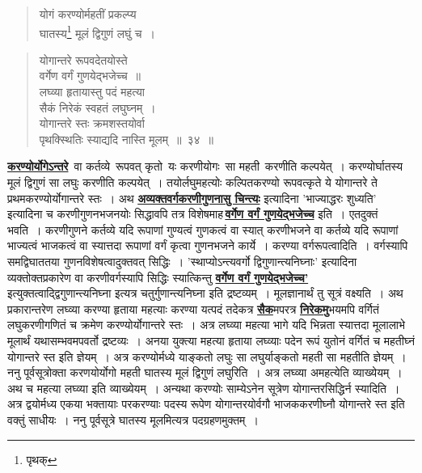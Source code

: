 \documentclass[11pt, openany]{book}
\begin{document}
 \label{34}
{\begin{quote}
\ab
योगं करण्योर्महतीं प्रकल्प्य \\
घातस्य\footnote{पृथक्} मूलं द्विगुणं लघुं च~।
\end{quote}
\thispagestyle{empty}
\afterpage{\fancyhead[LE,RO]{\thepage}}
\cfoot{}
\newpage 

{\begin{quote}
 {\ab योगान्तरे रूपवदेतयोस्ते \\
 वर्गेण वर्गं गुणयेद्भजेच्च~॥\\
लघ्व्या हृतायास्तु पदं महत्या \\
सैकं निरेकं स्वहतं लघुघ्नम्~। \\
योगान्तरे स्तः क्रमशस्तयोर्वा \\
पृथक्स्थितिः स्याद्यदि नास्ति मूलम्~॥~३४~॥}  
\end{quote}

\hyperref[34]{\textbf{करण्योर्योगेऽन्तरे}} \,वा कर्तव्ये \,रूपवत् कृतो \,यः करणीयोगः \,सा महती \,करणीति 
कल्पयेत्~। करण्योर्घातस्य मूलं द्विगुणं सा लघुः करणीति कल्पयेत्~।
तयोर्लघुमहत्योः कल्पितकरण्यो रूपवत्कृते ये योगान्तरे ते
प्रथमकरण्योर्योगान्तरे स्तः~। अथ \hyperref[27]{\textbf{अव्यक्तवर्गकरणीगुणनासु चिन्त्यः}} इत्यादिना {\qt 'भाज्याद्धरः शुध्यति'} इत्यादिना च करणीगुणनभजनयोः सिद्धावपि तत्र विशेषमाह\textendash \,\hyperref[34]{\textbf{वर्गेण वर्गं गुणयेद्भजेच्च}} इति~। एतदुक्तं भवति~। करणीगुणने कर्तव्ये यदि रूपाणां गुण्यत्वं गुणकत्वं वा 
स्यात् करणीभजने वा कर्तव्ये यदि रूपाणां भाज्यत्वं भाजकत्वं वा स्यात्तदा
रूपाणां वर्गं कृत्वा गुणनभजने कार्ये~। करण्या वर्गरूपत्वादिति~।
वर्गस्यापि समद्विघाततया गुणनविशेषत्वादुक्तवत् सिद्धिः~। {\qt 'स्थाप्योऽन्त्यवर्गो
द्विगुणान्त्यनिघ्नाः'} इत्यादिना व्यक्तोक्तप्रकारेण वा करणीवर्गस्यापि सिद्धिः स्यात्किन्तु
\hyperref[34]{\textbf{वर्गेण वर्गं गुणयेद्भजेच्च'}} इत्युक्तत्वाद्द्विगुणान्त्यनिघ्ना
इत्यत्र चतुर्गुणान्त्यनिघ्ना  इति द्रष्टव्यम्~। मूलज्ञानार्थं तु सूत्रं वक्ष्यति~। अथ प्रकारान्तरेण
लघ्व्या करण्या  हृताया महत्याः करण्या यत्पदं तदेकत्र \hyperref[34]{\textbf{सैक}}मपरत्र \hyperref[34]{\textbf{निरेकमु}}भयमपि वर्गितं लघुकरणीगणितं च क्रमेण करण्योर्योगान्तरे स्तः~। अत्र लघ्व्या महत्या भागे
यदि  भिन्नता स्यात्तदा मूलालाभे मूलार्थं यथासम्भवमपवर्तो द्रष्टव्यः~। अनया
युक्त्या महत्या हृताया लघ्व्याः पदेन रूपं युतोनं वर्गितं  च महतीघ्नं
योगान्तरे स्त  इति ज्ञेयम्~। अत्र करण्योर्मध्ये याङ्कतो लघुः सा लघुर्याङ्कतो महती सा महतीति ज्ञेयम्~। ननु पूर्वसूत्रोक्ता करणयोर्योगो महती घातस्य मूलं
द्विगुणं लघुरिति~। अत्र लघ्व्या अमहत्येति व्याख्येयम्~। अथ च महत्या लघ्व्या इति व्याख्येयम्~। अन्यथा करण्योः साम्येऽनेन सूत्रेण योगान्तरसिद्धिर्न
स्यादिति~। अत्र द्वयोर्मध्य एकया भक्तायाः परकरण्याः पदस्य रूपेण योगान्तरयोर्वगौ
भाजककरणीघ्नौ योगान्तरे स्त इति वक्तुं साधीयः~। ननु पूर्वसूत्रे घातस्य मूलमित्यत्र
पदग्रहणमुक्तम्~।
\newpage

}}
\end{document}
